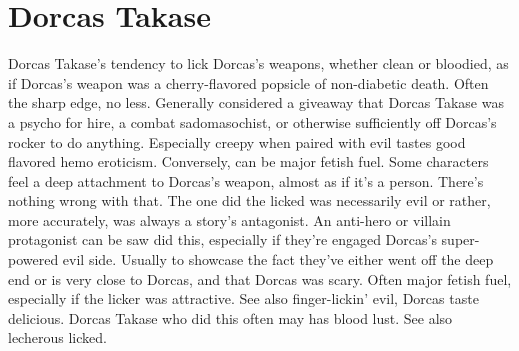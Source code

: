 \documentclass[12pt]{book}
\begin{document}
\chapter{Dorcas Takase}

Dorcas Takase's tendency to lick Dorcas's weapons, whether clean or bloodied, as if Dorcas's weapon was a cherry-flavored popsicle of non-diabetic death. Often the sharp edge, no less. Generally considered a giveaway that Dorcas Takase was a psycho for hire, a combat sadomasochist, or otherwise sufficiently off Dorcas's rocker to do anything. Especially creepy when paired with evil tastes good flavored hemo eroticism. Conversely, can be major fetish fuel. Some characters feel a deep attachment to Dorcas's weapon, almost as if it's a person. There's nothing wrong with that. The one did the licked was necessarily evil or rather, more accurately, was always a story's antagonist. An anti-hero or villain protagonist can be saw did this, especially if they're engaged Dorcas's super-powered evil side. Usually to showcase the fact they've either went off the deep end or is very close to Dorcas, and that Dorcas was scary. Often major fetish fuel, especially if the licker was attractive. See also finger-lickin' evil, Dorcas taste delicious. Dorcas Takase who did this often may has blood lust. See also lecherous licked.
\end{document}
